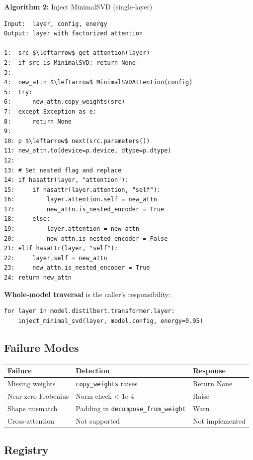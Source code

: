 \textbf{Algorithm 2:} Inject MinimalSVD (single-layer)
\begin{lstlisting}
Input:  layer, config, energy  
Output: layer with factorized attention

1:  src $\leftarrow$ get_attention(layer)
2:  if src is MinimalSVD: return None
3:
4:  new_attn $\leftarrow$ MinimalSVDAttention(config)
5:  try:
6:      new_attn.copy_weights(src)
7:  except Exception as e:
8:      return None
9:
10: p $\leftarrow$ next(src.parameters())
11: new_attn.to(device=p.device, dtype=p.dtype)
12:
13: # Set nested flag and replace
14: if hasattr(layer, "attention"):
15:     if hasattr(layer.attention, "self"):
16:         layer.attention.self = new_attn
17:         new_attn.is_nested_encoder = True
18:     else:
19:         layer.attention = new_attn
20:         new_attn.is_nested_encoder = False
21: elif hasattr(layer, "self"):
22:     layer.self = new_attn
23:     new_attn.is_nested_encoder = True
24: return new_attn
\end{lstlisting}

\textbf{Whole-model traversal} is the caller's responsibility:

\begin{lstlisting}
for layer in model.distilbert.transformer.layer:
    inject_minimal_svd(layer, model.config, energy=0.95)
\end{lstlisting}

\subsection{Failure Modes}

\begin{table}[H]
\centering
\small
\begin{tabular}{lll}
\toprule
\textbf{Failure} & \textbf{Detection} & \textbf{Response} \\
\midrule
Missing weights & \texttt{copy\_weights} raises & Return None \\
Near-zero Frobenius & Norm check < 1e-4 & Raise \\
Shape mismatch & Padding in \texttt{decompose\_from\_weight} & Warn \\
Cross-attention & Not supported & Not implemented \\
\bottomrule
\end{tabular}
\end{table}

\subsection{Registry}

